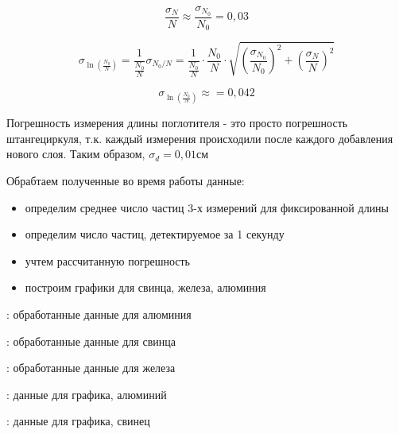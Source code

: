 	\[ \frac{\sigma_N}{N} \approx \frac{\sigma_{N_{0}}}{N_{0}} = 0,03 \]

	\[	\sigma_{\ln\left(\frac{N_0}{N}\right)} = \frac{1}{\frac{N_0}{N}} \sigma_{N_0/N} = \frac{1}{\frac{N_0}{N}} \cdot \frac{N_0}{N} \cdot \sqrt{\left(\frac{\sigma_{N_0}}{N_0}\right)^2+\left(\frac{\sigma_{N}}{N}\right)^2} \]

	\[  \sigma_{\ln\left(\frac{N_0}{N}\right)} \approx = 0,042 \]


	Погрешность измерения длины поглотителя - это просто погрешность штангециркуля, т.к. каждый измерения происходили после каждого добавления нового слоя.
	Таким образом, $\sigma_d = 0,01 см$
		
	
	Обрабтаем полученные во время работы данные:

	\begin{itemize}
		\item определим среднее число частиц 3-х измерений для фиксированной длины
		\item определим число частиц, детектируемое за 1 секунду
		\item учтем рассчитанную погрешность
		\item построим графики для свинца, железа, алюминия
	\end{itemize}

	\begin{table}[h!]
		\centering
		
		\caption{: обработанные данные для алюминия}
	\label{tb1}
	\end{table}

	\begin{table}[h!]
		\centering
		
		\caption{: обработанные данные для свинца}
	\label{tb2}
	\end{table}

	\begin{table}[h!]
		\centering
		
		\caption{: обработанные данные для железа}
	\label{tb3}
	\end{table}	
	
	

	\begin{table}[h!]
		\centering
		
		\caption{: данные для графика, алюминий}
	\label{tb4}
	\end{table}

	\begin{table}[h!]
		\centering
		
		\caption{: данные для графика, свинец}
	\label{tb5}
	\end{table}

